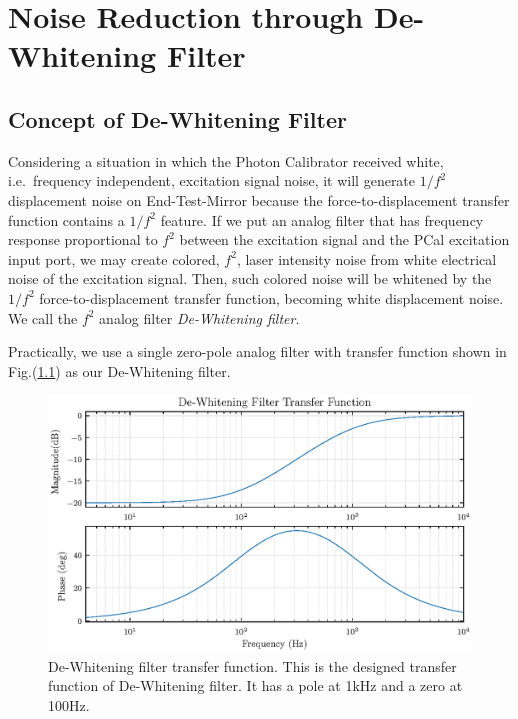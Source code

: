 

\chapter{Noise Reduction through De-Whitening Filter}

\section{Concept of De-Whitening Filter}
Considering a situation in which the Photon Calibrator received white, i.e.~frequency independent, excitation signal noise, it will generate $1/f^2$ displacement noise on End-Test-Mirror because the force-to-displacement transfer function contains a $1/f^2$ feature. If we put an analog filter that has frequency response proportional to $f^2$ between the excitation signal and the PCal excitation input port, we may create colored, $f^2$, laser intensity noise from white electrical noise of the excitation signal. Then, such colored noise will be whitened by the $1/f^2$ force-to-displacement transfer function, becoming white displacement noise. We call the $f^2$ analog filter \emph{De-Whitening filter}.


Practically, we use a single zero-pole analog filter with transfer function shown in Fig.(\ref{fig:DEWtf_design}) as our De-Whitening filter. 

\begin{figure}[hbt!]
\centering
\includegraphics[width=1\textwidth]{figure/DEWtf_design}
\caption[De-Whitening filter transfer function]{De-Whitening filter transfer function. This is the designed transfer function of De-Whitening filter. It has a pole at 1kHz and a zero at 100Hz. }
\label{fig:DEWtf_design}
\end{figure}





